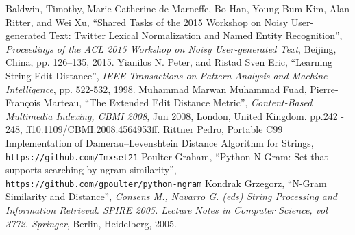 \documentclass[11pt]{article}
\begin{document}
\begin{thebibliography}{100}
   Baldwin, Timothy, Marie Catherine de Marneffe, Bo Han, Young-Bum Kim, Alan Ritter,
and Wei Xu, ``Shared Tasks of the 2015 Workshop on Noisy User-generated Text:
Twitter Lexical Normalization and Named Entity Recognition'', \emph{Proceedings of the ACL
2015 Workshop on Noisy User-generated Text}, Beijing, China, pp. 126–135, 2015.
   Yianilos N. Peter, and Ristad Sven Eric, ``Learning String Edit Distance'', \emph{IEEE Transactions on Pattern Analysis and Machine Intelligence}, pp. 522-532, 1998.
   Muhammad Marwan Muhammad Fuad, Pierre-François Marteau, ``The Extended Edit Distance Metric'', \emph{Content-Based Multimedia Indexing, CBMI 2008}, Jun 2008, London, United Kingdom. pp.242 -
248, ff10.1109/CBMI.2008.4564953ff.
  Rittner Pedro, Portable C99 Implementation of Damerau–Levenshtein Distance Algorithm for Strings, \\\texttt{https://github.com/Imxset21} 
   Poulter Graham, ``Python N-Gram: Set that supports searching by ngram similarity'', \texttt{https://github.com/gpoulter/python-ngram} 
   Kondrak Grzegorz, ``N-Gram Similarity and Distance'', \emph{Consens M., Navarro G. (eds) String Processing and Information Retrieval. SPIRE 2005. Lecture Notes in Computer Science, vol 3772. Springer}, Berlin, Heidelberg, 2005.
\end{thebibliography}
\end{document}
